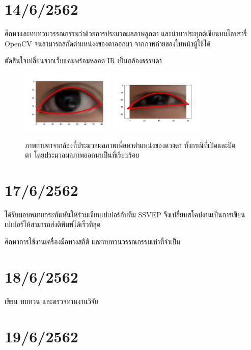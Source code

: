 \section*{14/6/2562}

ศึกษาและทบทวนวรรณกรรมว่าด้วยการประมวลผลภาพลูกตา และนำมาประยุกต์เขียนบนไลบรารี่ OpenCV จนสามารถสกัดตำแหน่งงของตาออกมา
จากภาพถ่ายของใบหน้าผู้ใช้ได้

ตัดสินใจเปลี่ยนจากเว็บแคมพร้อมหลอด IR เป็นกล้องธรรมดา

\begin{figure}[H]
    \centering
    \includegraphics[width=0.4\textwidth]{images/111.png}
    \includegraphics[width=0.4\textwidth]{images/171.png}
    \caption{ภาพถ่ายตาจากล้องที่ประมวลผลภาพเพื่อหาตำแหน่งของดวงตา ทั้งกรณีที่เปิดและปิดตา โดยประมวลผลภาพออกมาเป็นที่เรียบร้อย}
\end{figure}

\section*{17/6/2562}

ได้รับมอบหมายกระทันหันให้ร่วมเขียนเปเปอร์กับทีม SSVEP จีงเปลี่ยนสโคปงานเป็นการเขียนเปเปอร์ให้สามารถส่งตีพิมพ์ได้เร็วที่สุด

ศึกษาการใช้งานเครื่องมือทางสถิติ และทบทวนวรรณกรรมเท่าที่จำเป็น

\section*{18/6/2562}

เขียน ทบทวน และตรวจทานงานวิจัย

\section*{19/6/2562}

